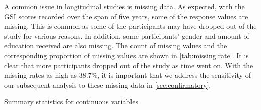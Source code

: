 A common issue in longitudinal studies is missing data. As expected, with the GSI scores recorded over the span of five years, some of the response values are missing. This is common as some of the participants may have dropped out of the study for various reasons. In addition, some participants' gender and amount of education received are also missing. The count of missing values and the corresponding proportion of missing values are shown in \cref{tab:missing.rate}. It is clear that more participants dropped out of the study as time went on. With the missing rates as high as 38.7\%, it is important that we address the sensitivity of our subsequent analysis to these missing data in \cref{sec:confirmatory}.
\begin{table}[h]
\begin{minipage}{0.5\textwidth}
\centering
{}
\caption{Summary statistics for continuous variables}
\label{tab:summ.stat.cont}
\end{minipage}
\hfill
\begin{minipage}{0.5\textwidth}
\centering
{}
\caption{Missing rates of all variables in the study}
\label{tab:missing.rate}
\end{minipage}
\end{table}
